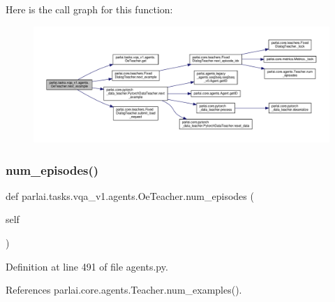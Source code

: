 Here is the call graph for this function\+:
\nopagebreak
\begin{figure}[H]
\begin{center}
\leavevmode
\includegraphics[width=350pt]{classparlai_1_1tasks_1_1vqa__v1_1_1agents_1_1OeTeacher_a42df8da64edbf22fcc976b1cd02ef252_cgraph}
\end{center}
\end{figure}
\mbox{\label{classparlai_1_1tasks_1_1vqa__v1_1_1agents_1_1OeTeacher_aa932b35d88d65d7f5d61b271bbee71ac}} 
\subsubsection{\texorpdfstring{num\+\_\+episodes()}{num\_episodes()}}
{\footnotesize\ttfamily def parlai.\+tasks.\+vqa\+\_\+v1.\+agents.\+Oe\+Teacher.\+num\+\_\+episodes (\begin{DoxyParamCaption}\item[{}]{self }\end{DoxyParamCaption})}



Definition at line 491 of file agents.\+py.



References parlai.\+core.\+agents.\+Teacher.\+num\+\_\+examples().

